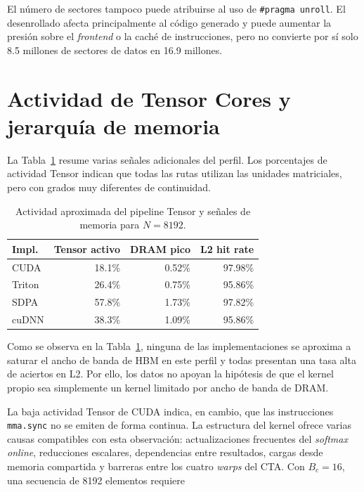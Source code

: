 El número de sectores tampoco puede atribuirse al uso de \texttt{\#pragma unroll}. El desenrollado afecta principalmente al código generado y puede aumentar la presión sobre el \textit{frontend} o la caché de instrucciones, pero no convierte por sí solo 8.5 millones de sectores de datos en 16.9 millones.

\section{Actividad de Tensor Cores y jerarquía de memoria}

La Tabla~\ref{tab:tensor_activity} resume varias señales adicionales del perfil. Los porcentajes de actividad Tensor indican que todas las rutas utilizan las unidades matriciales, pero con grados muy diferentes de continuidad.

\begin{table}[H]
\centering
\caption{Actividad aproximada del pipeline Tensor y señales de memoria para \(N=8192\).}
\label{tab:tensor_activity}
\begin{tabular}{lrrr}
\toprule
\textbf{Impl.} & \textbf{Tensor activo} & \textbf{DRAM pico} & \textbf{L2 hit rate} \\
\midrule
CUDA   & 18.1\% & 0.52\% & 97.98\% \\
Triton & 26.4\% & 0.75\% & 95.86\% \\
SDPA   & 57.8\% & 1.73\% & 97.82\% \\
cuDNN  & 38.3\% & 1.09\% & 95.86\% \\
\bottomrule
\end{tabular}
\end{table}

Como se observa en la Tabla~\ref{tab:tensor_activity}, ninguna de las implementaciones se aproxima a saturar el ancho de banda de HBM en este perfil y todas presentan una tasa alta de aciertos en L2. Por ello, los datos no apoyan la hipótesis de que el kernel propio sea simplemente un kernel limitado por ancho de banda de DRAM.

La baja actividad Tensor de CUDA indica, en cambio, que las instrucciones \texttt{mma.sync} no se emiten de forma continua. La estructura del kernel ofrece varias causas compatibles con esta observación: actualizaciones frecuentes del \textit{softmax online}, reducciones escalares, dependencias entre resultados, cargas desde memoria compartida y barreras entre los cuatro \textit{warps} del CTA. Con \(B_c=16\), una secuencia de 8192 elementos requiere

